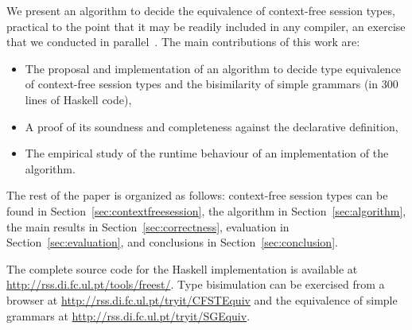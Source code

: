 

We present an algorithm to decide the equivalence of context-free
session types, practical to the point that it may be readily included
in any compiler, an exercise that we conducted in
parallel~\cite{almeida.etal_freest-functional-language}.
%
The main contributions of this work are:
%
\begin{itemize}
\item The proposal and implementation of an algorithm to decide type
  equivalence of context-free session types and the bisimilarity of 
  simple grammars (in 300 lines of Haskell code),
\item A proof of its soundness and completeness against the
  declarative definition,
\item The empirical study of the runtime behaviour of an
  implementation of the algorithm.
\end{itemize}


The rest of the paper is organized as follows: context-free session
types can be found in Section~\ref{sec:contextfreesession}, the
algorithm in Section~\ref{sec:algorithm}, the main results in
Section~\ref{sec:correctness},
evaluation in Section~\ref{sec:evaluation}, and conclusions in
Section~\ref{sec:conclusion}.

The complete source code for the Haskell implementation is available
at \url{http://rss.di.fc.ul.pt/tools/freest/}.
%
Type bisimulation can be exercised from a browser at
\url{http://rss.di.fc.ul.pt/tryit/CFSTEquiv} and the equivalence of
simple grammars at \url{http://rss.di.fc.ul.pt/tryit/SGEquiv}.

